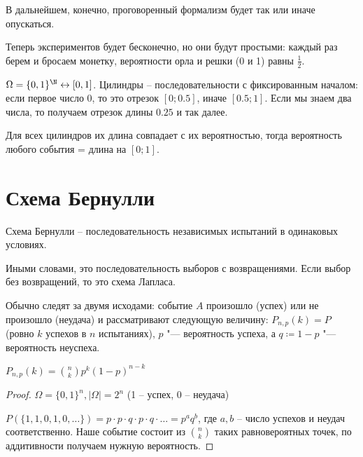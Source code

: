 \begin{Rem}
В дальнейшем, конечно, проговоренный формализм будет так или иначе опускаться.
\end{Rem}

\begin{exmp}
Теперь экспериментов будет бесконечно, но они будут простыми: каждый раз берем и бросаем монетку, вероятности орла и решки (0 и 1) равны $\frac12$.

$\Omega = \{0, 1\}^{\N} \leftrightarrow [0, 1]$.
Цилиндры -- последовательности с фиксированным началом: если первое число 0, то это отрезок $[0; 0.5]$, иначе $[0.5; 1]$.
Если мы знаем два числа, то получаем отрезок длины $0.25$ и так далее.

Для всех цилиндров их длина совпадает с их вероятностью, тогда вероятность любого события = длина на $[0; 1]$.
\end{exmp}

\section{Схема Бернулли}

\begin{Def}
Схема Бернулли -- последовательность независимых испытаний в одинаковых условиях.    
\end{Def}

\begin{Rem}
Иными словами, это последовательность выборов с возвращениями.
Если выбор без возвращений, то это схема Лапласа.
\end{Rem}

Обычно следят за двумя исходами: событие $A$ произошло (успех) или не произошло (неудача) и рассматривают следующую величину:
$P_{n,p}(k) = P$(ровно $k$ успехов в $n$ испытаниях), $p$ "--- вероятность успеха, а $q \coloneq 1-p$ "--- вероятность неуспеха.

\begin{theorem}
    $P_{n,p}(k) = {n \choose k} p^k (1-p)^{n-k}$
\end{theorem}
\begin{proof}
    $\Omega = \{0, 1\}^n, |\Omega| = 2^n$ (1 -- успех, 0 -- неудача)

    $P(\{1, 1, 0, 1, 0, \dots \}) = p \cdot p \cdot q \cdot p \cdot q \cdot \dots = p^{a}q^{b}$, где $a, b$ -- число успехов и неудач соответственно.
    Наше событие состоит из ${n \choose k}$ таких равновероятных точек, по аддитивности получаем нужную вероятность.
\end{proof}                                                                  

